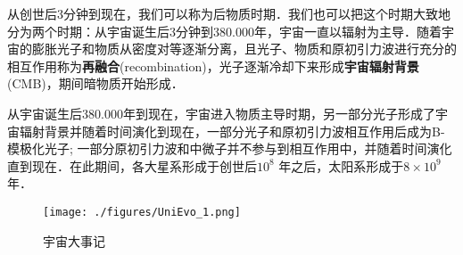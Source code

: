 从创世后3分钟到现在，我们可以称为后物质时期．我们也可以把这个时期大致地分为两个时期：从宇宙诞生后3分钟到380.000年，宇宙一直以辐射为主导．随着宇宙的膨胀光子和物质从密度对等逐渐分离，且光子、物质和原初引力波进行充分的相互作用称为\textbf{再融合}(recombination)，光子逐渐冷却下来形成\textbf{宇宙辐射背景}(CMB)，期间暗物质开始形成．

从宇宙诞生后380.000年到现在，宇宙进入物质主导时期，另一部分光子形成了宇宙辐射背景并随着时间演化到现在，一部分光子和原初引力波相互作用后成为B-模极化光子; 一部分原初引力波和中微子并不参与到相互作用中，并随着时间演化直到现在．在此期间，各大星系形成于创世后$10^8$ 年之后，太阳系形成于$8\times 10^9$年．

\begin{figure}[ht]
\centering
\texttt{[image: ./figures/UniEvo\_1.png]}
\caption{宇宙大事记} \label{UniEvo_fig1}
\end{figure}